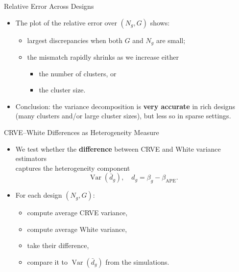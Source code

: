 \documentclass[
  ignorenonframetext,
]{beamer}
\providecommand{\tightlist}{%
  \setlength{\itemsep}{0pt}\setlength{\parskip}{0pt}}
\begin{document}
\begin{frame}{Relative Error Across Designs}
\label{relative-error-across-designs}
\begin{itemize}
\tightlist
\item
  The plot of the relative error over \((N_g,G)\) shows:

  \begin{itemize}
  \tightlist
  \item
    largest discrepancies when both \(G\) and \(N_g\) are small;
  \item
    the mismatch rapidly shrinks as we increase either

    \begin{itemize}
    \tightlist
    \item
      the number of clusters, or
    \item
      the cluster size.
    \end{itemize}
  \end{itemize}
\item
  Conclusion: the variance decomposition is \textbf{very accurate} in
  rich designs (many clusters and/or large cluster sizes), but less so
  in sparse settings.
\end{itemize}
\end{frame}

\begin{frame}{CRVE--White Differences as Heterogeneity Measure}
\label{crvewhite-differences-as-heterogeneity-measure}
\begin{itemize}
\tightlist
\item
  We test whether the \textbf{difference} between CRVE and White
  variance estimators\\
  captures the heterogeneity component \[
  \operatorname{Var}(\bar d_g),\quad
  d_g = \beta_g - \beta_{\text{APE}}.
  \]
\item
  For each design \((N_g, G)\):

  \begin{itemize}
  \tightlist
  \item
    compute average CRVE variance,
  \item
    compute average White variance,
  \item
    take their difference,
  \item
    compare it to \(\operatorname{Var}(\bar d_g)\) from the simulations.
  \end{itemize}
\end{itemize}
\end{frame}
\end{document}
